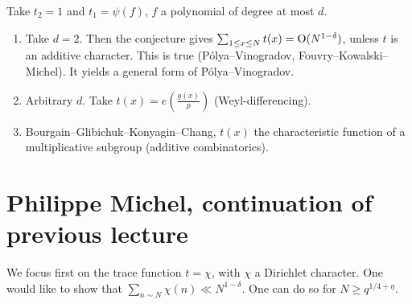 \documentclass[reqno]{amsart} 
\numberwithin{theorem}{section}
\numberwithin{equation}{section}
\begin{document}
\begin{example}
  Take $t_2 = 1$ and $t_1 = \psi(f)$, $f$ a polynomial of degree at most $d$.
\end{example}

\begin{example}
  \begin{enumerate}
  \item Take $d = 2$.  Then the conjecture gives $\sum_{1 \leq x \leq N} t(x) = \operatorname{O}(N^{1 - \delta})$, unless $t$ is an additive character.  This is true (Pólya--Vinogradov, Fouvry--Kowalski--Michel).  It yields a general form of Pólya--Vinogradov.
  \item Arbitrary $d$.  Take $t(x) = e \left( \frac{g(x)}{p} \right)$ (Weyl-differencing).
  \item Bourgain--Glibichuk--Konyagin--Chang, $t(x)$ the characteristic function of a multiplicative subgroup (additive combinatorics).
  \end{enumerate}
\end{example}

\section{Philippe Michel, continuation of previous lecture}

We focus first on the trace function $t = \chi$, with $\chi$ a Dirichlet character.  One would like to show that $\sum_{n \sim N} \chi(n) \ll N^{1 - \delta}$.  One can do so for $N \geq q^{1/4 + \eta}$.
\end{document}
